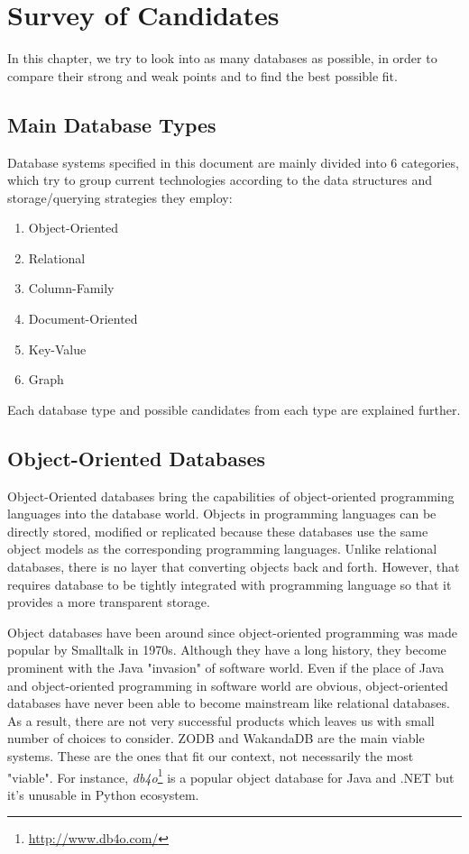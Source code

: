 \chapter{Survey of Candidates}

\par In this chapter, we try to look into as many databases as possible, in order to compare their strong and weak points and to find the best possible fit.

\section{Main Database Types}

Database systems specified in this document are mainly divided into 6 categories, which try to group current technologies according to the data structures and storage/querying strategies they employ:

\begin{enumerate}
  \item Object-Oriented
  \item Relational
  \item Column-Family
  \item Document-Oriented
  \item Key-Value
  \item Graph
\end{enumerate}

Each database type and possible candidates from each type are explained further.

\section{Object-Oriented Databases}

Object-Oriented databases bring the capabilities of object-oriented programming languages into the database world. Objects in programming languages can be directly stored, modified or replicated because these databases use the same object models as the corresponding programming languages. Unlike relational databases, there is no layer that converting objects back and forth. However, that requires database to be tightly integrated with programming language so that it provides a more transparent storage.

Object databases have been around since object-oriented programming was made popular by Smalltalk in 1970s. Although they have a long history, they become prominent with the Java "invasion" of software world. Even if the place of Java and object-oriented programming in software world are obvious, object-oriented databases have never been able to become mainstream like relational databases. As a result, there are not very successful products which leaves us with small number of choices to consider. ZODB and WakandaDB are the main viable systems. These are the ones that fit our context, not necessarily the most "viable". For instance, \textit{db4o}\footnote{\url{http://www.db4o.com/}} is a popular object database for Java and .NET but it's unusable in Python ecosystem.

